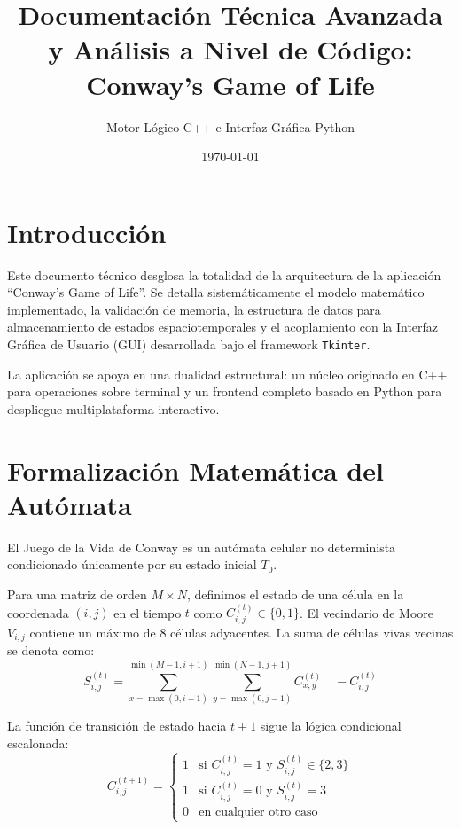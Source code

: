 \documentclass[12pt,a4paper]{article}
\title{\Huge Documentación Técnica Avanzada y Análisis a Nivel de Código:\\ \Large Conway's Game of Life}
\author{Motor Lógico C++ e Interfaz Gráfica Python}
\date{\today}
\begin{document}
\maketitle

\tableofcontents
\newpage

\section{Introducción}
Este documento técnico desglosa la totalidad de la arquitectura de la aplicación ``Conway's Game of Life''. Se detalla sistemáticamente el modelo matemático implementado, la validación de memoria, la estructura de datos para almacenamiento de estados espaciotemporales y el acoplamiento con la Interfaz Gráfica de Usuario (GUI) desarrollada bajo el framework \texttt{Tkinter}.

La aplicación se apoya en una dualidad estructural: un núcleo originado en C++ para operaciones sobre terminal y un frontend completo basado en Python para despliegue multiplataforma interactivo.

\section{Formalización Matemática del Autómata}
El Juego de la Vida de Conway es un autómata celular no determinista condicionado únicamente por su estado inicial $T_0$.

Para una matriz de orden $M \times N$, definimos el estado de una célula en la coordenada $(i, j)$ en el tiempo $t$ como $C^{(t)}_{i,j} \in \{0, 1\}$.
El vecindario de Moore $V_{i,j}$ contiene un máximo de 8 células adyacentes. La suma de células vivas vecinas se denota como:
\begin{equation}
S^{(t)}_{i,j} = \sum_{x=\max(0, i-1)}^{\min(M-1, i+1)} \sum_{y=\max(0, j-1)}^{\min(N-1, j+1)} C^{(t)}_{x,y} \quad - C^{(t)}_{i,j}
\end{equation}

La función de transición de estado hacia $t+1$ sigue la lógica condicional escalonada:
\begin{equation}
C^{(t+1)}_{i,j} = 
\begin{cases} 
1 & \text{si } C^{(t)}_{i,j} = 1 \text{ y } S^{(t)}_{i,j} \in \{2, 3\} \\
1 & \text{si } C^{(t)}_{i,j} = 0 \text{ y } S^{(t)}_{i,j} = 3 \\
0 & \text{en cualquier otro caso}
\end{cases}
\end{equation}
\end{document}

